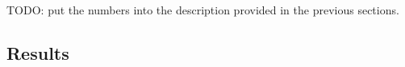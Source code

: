 \documentclass{IEEEtran}
\begin{document}
% 
%

TODO: put the numbers into the description provided in the previous sections. 

\subsection{Results}
\end{document}
